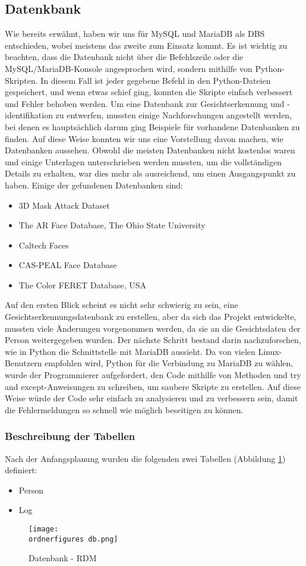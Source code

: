 \subsection{Datenkbank}
Wie bereits erwähnt, haben wir uns für MySQL und MariaDB als DBS entschieden, wobei meistens das zweite zum Einsatz kommt. Es ist wichtig zu beachten, dass die Datenbank nicht über die Befehlszeile oder die MySQL/MariaDB-Konsole angesprochen wird, sondern mithilfe von Python-Skripten. In diesem Fall ist jeder gegebene Befehl in den Python-Dateien gespeichert, und wenn etwas schief ging, konnten die Skripte einfach verbessert und Fehler behoben werden.
\bigbreak
Um eine Datenbank zur Gesichtserkennung und -identifikation zu entwerfen, mussten einige Nachforschungen angestellt werden, bei denen es hauptsächlich darum ging Beispiele für vorhandene Datenbanken zu finden. Auf diese Weise konnten wir uns eine Vorstellung davon machen, wie Datenbanken aussehen. Obwohl die meisten Datenbanken nicht kostenlos waren und einige Unterlagen unterschrieben werden mussten, um die vollständigen Details zu erhalten, war dies mehr als ausreichend, um einen Ausgangspunkt zu haben. Einige der gefundenen Datenbanken sind:
\begin{itemize}
	\item 3D Mask Attack Dataset\cite{Database1}
	\item The AR Face Database, The Ohio State University\cite{Database2}
	\item Caltech Faces\cite{Database3}
	\item CAS-PEAL Face Database\cite{Database4}
	\item The Color FERET Database, USA\cite{Database5}
\end{itemize}
Auf den ersten Blick scheint es nicht sehr schwierig zu sein, eine Gesichtserkennungsdatenbank zu erstellen, aber da sich das Projekt entwickelte, mussten viele Änderungen vorgenommen werden, da sie an die Gesichtsdaten der Person weitergegeben wurden.
\bigbreak
Der nächste Schritt bestand darin nachzuforschen, wie in Python die Schnittstelle mit MariaDB aussieht. Da von vielen Linux-Benutzern empfohlen wird, Python für die Verbindung zu MariaDB zu wählen, wurde der Programmierer aufgefordert, den Code mithilfe von Methoden und try and except-Anweisungen zu schreiben, um saubere Skripte zu erstellen. Auf diese Weise würde der Code sehr einfach zu analysieren und zu verbessern sein, damit die Fehlermeldungen so schnell wie möglich beseitigen zu können.
\subsubsection{Beschreibung der Tabellen}
Nach der Anfangsplanung wurden die folgenden zwei Tabellen (Abbildung \ref{fig:datenbank}) definiert:
\begin{itemize}
	\item Person
	\item Log
\end{itemize}
\begin{figure}[!htb]
  \centering
    \texttt{[image: \\ordnerfigures db.png]}
      \caption{Datenbank - RDM}
      \label{fig:datenbank}
\end{figure}
